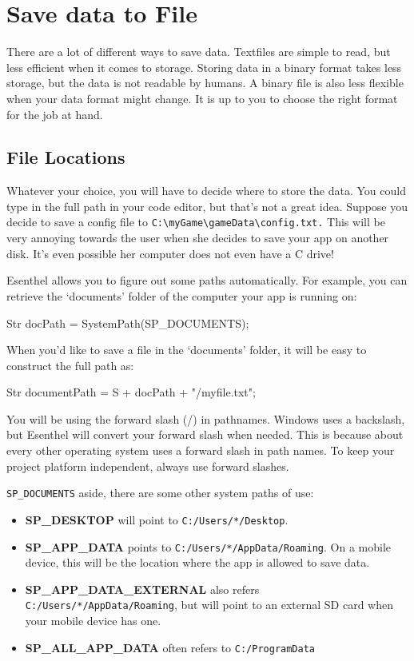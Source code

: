 \chapter{Save data to File}
There are a lot of different ways to save data. Textfiles are simple to read, but less efficient when it comes to storage. Storing data in a binary format takes less storage, but the data is not readable by humans. A binary file is also less flexible when your data format might change. It is up to you to choose the right format for the job at hand.

\section{File Locations}
Whatever your choice, you will have to decide where to store the data. You could type in the full path in your code editor, but that's not a great idea.
Suppose you decide to save a config file to \verb|C:\myGame\gameData\config.txt.| This will be very annoying towards the user when she decides to save your app on another disk. It's even possible her computer does not even have a C drive!

Esenthel allows you to figure out some paths automatically. For example, you can retrieve the `documents' folder of the computer your app is running on:

\begin{code}
Str docPath = SystemPath(SP_DOCUMENTS);
\end{code}

When you'd like to save a file in the `documents' folder, it will be easy to construct the full path as:

\begin{code}
Str documentPath = S + docPath + "/myfile.txt";
\end{code} 

\begin{note}
You will be using the forward slash (/) in pathnames. Windows uses a backslash, but Esenthel will convert your forward slash when needed. This is because about every other operating system uses a forward slash in path names. To keep your project platform independent, always use forward slashes.
\end{note}

\verb|SP_DOCUMENTS| aside, there are some other system paths of use:

\begin{itemize}
\item \textbf{SP\_DESKTOP} will point to \verb|C:/Users/*/Desktop|.
\item \textbf{SP\_APP\_DATA} points to \verb|C:/Users/*/AppData/Roaming|. On a mobile device, this will be the location where the app is allowed to save data.
\item \textbf{SP\_APP\_DATA\_EXTERNAL} also refers \verb|C:/Users/*/AppData/Roaming|, but will point to an external SD card when your mobile device has one.
\item \textbf{SP\_ALL\_APP\_DATA} often refers to \verb|C:/ProgramData|
\end{itemize}

